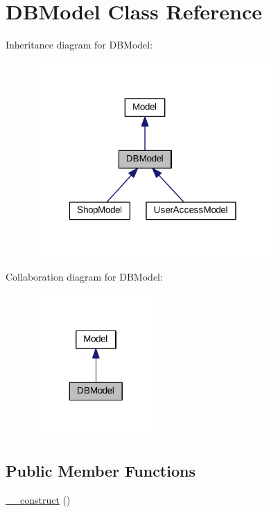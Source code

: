\hypertarget{classDBModel}{\section{D\+B\+Model Class Reference}
\label{classDBModel}
}


Inheritance diagram for D\+B\+Model\+:\nopagebreak
\begin{figure}[H]
\begin{center}
\leavevmode
\includegraphics[width=259pt]{classDBModel__inherit__graph}
\end{center}
\end{figure}


Collaboration diagram for D\+B\+Model\+:\nopagebreak
\begin{figure}[H]
\begin{center}
\leavevmode
\includegraphics[width=136pt]{classDBModel__coll__graph}
\end{center}
\end{figure}
\subsection*{Public Member Functions}
\begin{DoxyCompactItemize}
\item 
\hyperlink{classDBModel_a2c73c9e833b304628088149c76aad6c1}{\+\_\+\+\_\+construct} ()
\end{DoxyCompactItemize}
